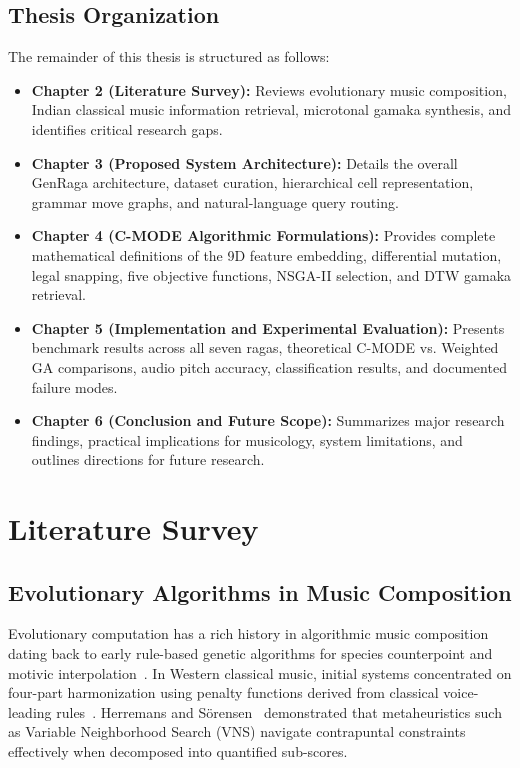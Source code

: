 \documentclass[12pt,a4paper]{report}
\begin{document}
\section{Thesis Organization}
The remainder of this thesis is structured as follows:
\begin{itemize}
    \item \textbf{Chapter 2 (Literature Survey):} Reviews evolutionary music composition, Indian classical music information retrieval, microtonal gamaka synthesis, and identifies critical research gaps.
    \item \textbf{Chapter 3 (Proposed System Architecture):} Details the overall GenRaga architecture, dataset curation, hierarchical cell representation, grammar move graphs, and natural-language query routing.
    \item \textbf{Chapter 4 (C-MODE Algorithmic Formulations):} Provides complete mathematical definitions of the 9D feature embedding, differential mutation, legal snapping, five objective functions, NSGA-II selection, and DTW gamaka retrieval.
    \item \textbf{Chapter 5 (Implementation and Experimental Evaluation):} Presents benchmark results across all seven ragas, theoretical C-MODE vs. Weighted GA comparisons, audio pitch accuracy, classification results, and documented failure modes.
    \item \textbf{Chapter 6 (Conclusion and Future Scope):} Summarizes major research findings, practical implications for musicology, system limitations, and outlines directions for future research.
\end{itemize}

\chapter{Literature Survey}

\section{Evolutionary Algorithms in Music Composition}
Evolutionary computation has a rich history in algorithmic music composition dating back to early rule-based genetic algorithms for species counterpoint and motivic interpolation~\cite{mcintyre1994,horner1991,maddox2000}. In Western classical music, initial systems concentrated on four-part harmonization using penalty functions derived from classical voice-leading rules~\cite{donnelly2011,donnelly2012,phonamnuaisuk1999}. Herremans and S{\"o}rensen~\cite{herremans2012,herremans2013} demonstrated that metaheuristics such as Variable Neighborhood Search (VNS) navigate contrapuntal constraints effectively when decomposed into quantified sub-scores.
\end{document}
